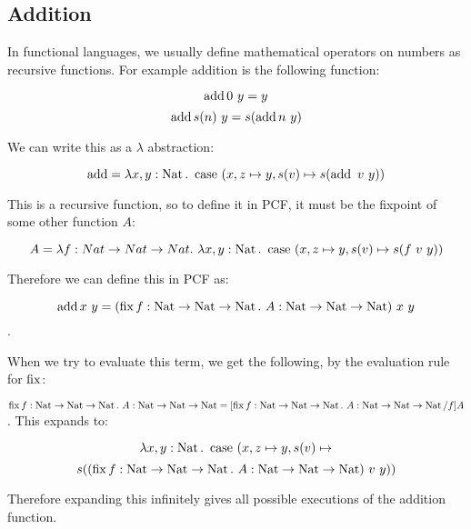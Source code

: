 \subsection{Addition}

In functional languages, we usually define mathematical operators on numbers as recursive functions. For example addition is the following function:

\[\operatorname{add}  0 \ y = y \]
\[\operatorname{add}  s(n) \ y = s(\operatorname{add}  n \ y)\]

We can write this as a $\lambda$ abstraction:

\[ \operatorname{add} = \lambda x,y : \operatorname{Nat}. \ \operatorname{case} \ (x, z \mapsto y, s(v) \mapsto s(\operatorname{add} \ v \ y))\]

This is a recursive function, so to define it in PCF, it must be the fixpoint of some other function $A$:

\[ A = \lambda f: Nat \to Nat \to Nat. \ \lambda x,y : \nat. \ \case \ (x, z \mapsto y, s(v) \mapsto s(f \ v \ y))\]

Therefore we can define this in PCF as:

\[ \operatorname{add} x \ y = (\operatorname{fix} f : \operatorname{Nat} \to \operatorname{Nat} \to \operatorname{Nat} . \ A : \operatorname{Nat} \to \operatorname{Nat} \to \operatorname{Nat}) \ x \ y  \].

When we try to evaluate this term, we get the following, by the evaluation rule for $\operatorname{fix}$:

$\operatorname{fix} f : \operatorname{Nat} \to \operatorname{Nat} \to \operatorname{Nat} . \ A : \operatorname{Nat} \to \operatorname{Nat} \to \operatorname{Nat} = [\operatorname{fix} f : \operatorname{Nat} \to \operatorname{Nat} \to \operatorname{Nat} . \ A : \operatorname{Nat} \to \operatorname{Nat} \to \operatorname{Nat}/f]A$. This expands to:

\[ \lambda x,y : \operatorname{Nat}. \ \operatorname{case} \ (x, z \mapsto y, s(v) \mapsto \]
\[s((\fix f: \nat \to \nat \to \nat . \ A : \nat \to \nat \to \nat) \ v \ y)) \]

Therefore expanding this infinitely gives all possible executions of the addition function.

%

